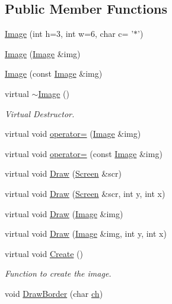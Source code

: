 \subsection*{Public Member Functions}
\begin{DoxyCompactItemize}
\item 
\hyperlink{classImage_a13aa6167bbc77b7a311a181d67caa058}{Image} (int h=3, int w=6, char c= '$\ast$')
\item 
\hyperlink{classImage_ad9a2ebd07a4f458ba24d91af0122418e}{Image} (\hyperlink{classImage}{Image} \&img)
\item 
\hyperlink{classImage_aa44ed77d00d96d2c878b050835f828c4}{Image} (const \hyperlink{classImage}{Image} \&img)
\item 
virtual \hyperlink{classImage_a0294f63700543e11c0f0da85601c7ae5}{$\sim$\-Image} ()
\begin{DoxyCompactList}\small\item\em Virtual Destructor. \end{DoxyCompactList}\item 
virtual void \hyperlink{classImage_abfcde35c430b0dae18df1c09b62700f0}{operator=} (\hyperlink{classImage}{Image} \&img)
\item 
virtual void \hyperlink{classImage_a4da7f72e4063bd0764caa635c0e0aaae}{operator=} (const \hyperlink{classImage}{Image} \&img)
\item 
virtual void \hyperlink{classImage_a057cb6b10590608656ff2a7aa159f515}{Draw} (\hyperlink{classScreen}{Screen} \&scr)
\item 
virtual void \hyperlink{classImage_a1e3d4ae638b3fc1fbee81c509c1551f6}{Draw} (\hyperlink{classScreen}{Screen} \&scr, int y, int x)
\item 
virtual void \hyperlink{classImage_ad20f87dc888d01cadc829f18d23066dc}{Draw} (\hyperlink{classImage}{Image} \&img)
\item 
virtual void \hyperlink{classImage_a2e863a5b8287ca3adb08fdaae513f437}{Draw} (\hyperlink{classImage}{Image} \&img, int y, int x)
\item 
virtual void \hyperlink{classImage_a6bb7dff9e4c4c31b2d63d7b0a330ef89}{Create} ()
\begin{DoxyCompactList}\small\item\em Function to create the image. \end{DoxyCompactList}\item 
void \hyperlink{classImage_a16f8719e59b1180aa7e0e2fdf3e4d421}{Draw\-Border} (char \hyperlink{classImage_a2d2bff881014df332b1086483d0eb0e9}{ch})
\item 

\end{DoxyCompactItemize}
